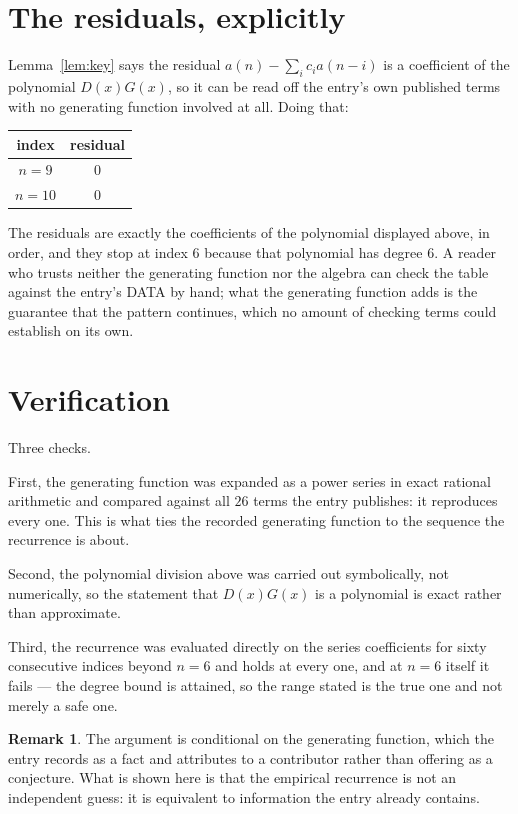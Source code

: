 \documentclass[11pt,a4paper]{article}
\theoremstyle{plain}
\theoremstyle{definition}
\newtheorem{remark}[theorem]{Remark}
\begin{document}
\section{The residuals, explicitly}

Lemma~\ref{lem:key} says the residual $a(n)-\sum_ic_ia(n-i)$ is a coefficient of the
polynomial $D(x)G(x)$, so it can be read off the entry's own published terms with no
generating function involved at all. Doing that:
\begin{center}
\begin{tabular}{cc}
index & residual \\ \hline
$n=9$ & $0$ \\
$n=10$ & $0$
\end{tabular}
\end{center}
The residuals are exactly the coefficients of the polynomial displayed above, in order, and
they stop at index $6$ because that polynomial has degree $6$. A reader who trusts
neither the generating function nor the algebra can check the table against the entry's DATA
by hand; what the generating function adds is the guarantee that the pattern continues, which
no amount of checking terms could establish on its own.

\section{Verification}

Three checks.

First, the generating function was expanded as a power series in exact rational arithmetic and
compared against all $26$ terms the entry publishes: it reproduces every one. This is
what ties the recorded generating function to the sequence the recurrence is about.

Second, the polynomial division above was carried out symbolically, not numerically, so the
statement that $D(x)G(x)$ is a polynomial is exact rather than approximate.

Third, the recurrence was evaluated directly on the series coefficients for sixty consecutive
indices beyond $n=6$ and holds at every one, and at $n=6$ itself it fails --- the
degree bound is attained, so the range stated is the true one and not merely a safe one.

\begin{remark}
The argument is conditional on the generating function, which the entry records as a fact and
attributes to a contributor rather than offering as a conjecture. What is shown here is that
the empirical recurrence is not an independent guess: it is equivalent to information the
entry already contains.
\end{remark}
\end{document}
